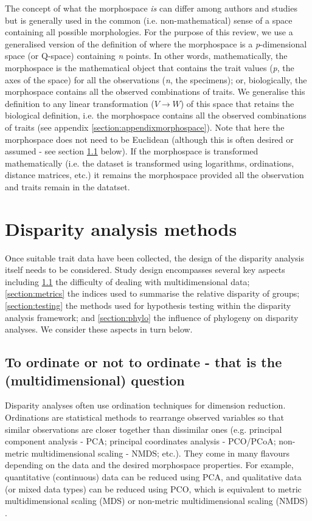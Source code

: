 \documentclass[12pt,letterpaper]{article}
\begin{document}
The concept of what the morphospace \textit{is} can differ among authors and studies but is generally used in the common (i.e. non-mathematical) sense of a space containing all possible morphologies.
For the purpose of this review, we use a generalised version of the definition of \cite{mitteroecker2009concept} where the morphospace is a \textit{p}-dimensional space (or Q-space) containing \textit{n} points.
In other words, mathematically, the morphospace is the mathematical object that contains the trait values (\textit{p}, the axes of the space) for all the observations (\textit{n}, the specimens); or, biologically, the morphospace contains all the observed combinations of traits.
We generalise this definition to any linear transformation ($V \to W$) of this space that retains the biological definition, i.e. the morphospace contains all the observed combinations of traits (see appendix \ref{section:appendixmorphospace}).
Note that here the morphospace does not need to be Euclidean (although this is often desired or assumed - see section \ref{section:ordination} below).
If the morphospace is transformed mathematically (i.e. the dataset is transformed using logarithms, ordinations, distance matrices, etc.) it remains the morphospace provided all the observation and traits remain in the datatset.


\section{Disparity analysis methods} \label{section:methods}

\noindent Once suitable trait data have been collected, the design of the disparity analysis itself needs to be considered.
Study design encompasses several key aspects including \ref{section:ordination} the difficulty of dealing with multidimensional data; \ref{section:metrics} the indices used to summarise the relative disparity of groups; \ref{section:testing} the methods used for hypothesis testing within the disparity analysis framework; and \ref{section:phylo} the influence of phylogeny on disparity analyses.
We consider these aspects in turn below.

\subsection{To ordinate or not to ordinate - that is the (multidimensional) question} \label{section:ordination}

Disparity analyses often use ordination techniques for dimension reduction.
Ordinations are statistical methods to rearrange observed variables so that similar observations are closer together than dissimilar ones (e.g. principal component analysis - PCA; principal coordinates analysis - PCO/PCoA; non-metric multidimensional scaling - NMDS; etc.).
They come in many flavours depending on the data and the desired morphospace properties.
For example, quantitative (continuous) data can be reduced using PCA, and qualitative data (or mixed data types) can be reduced using PCO, which is equivalent to metric multidimensional scaling (MDS) or non-metric multidimensional scaling (NMDS) \citep[see][chapter 9 for a detailed overview of ordination methods and properties]{Legendre2012-va}.
\end{document}
